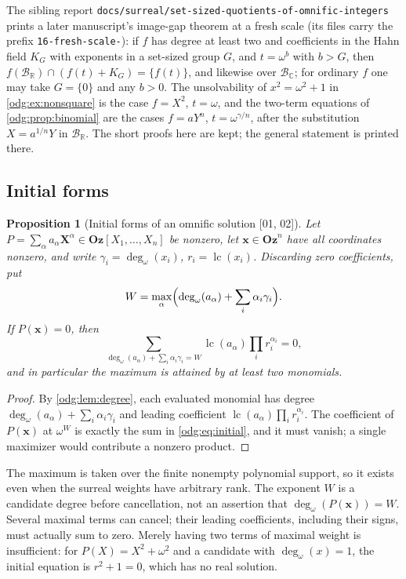\documentclass[11pt,oneside]{article}
\numberwithin{equation}{section}
\newtheorem{proposition}[proposition]{Proposition}
\theoremstyle{definition}
\theoremstyle{remark}
\newcommand{\Oz}{\mathbf{Oz}}
\newcommand{\R}{\mathbb R}
\newcommand{\C}{\mathbb C}
\newcommand{\BR}{\mathcal B_{\R}}
\newcommand{\BC}{\mathcal B_{\C}}
\newcommand{\lc}{\operatorname{lc}}
\newcommand{\ddeg}{\operatorname{deg}_{\omega}}
\newcommand{\src}[1]{\textup{\textsf{\small[#1]}}}
\newcommand{\fn}[1]{\nolinkurl{#1}}
\begin{document}
The sibling report \fn{docs/surreal/set-sized-quotients-of-omnific-integers}
prints a later manuscript's image-gap theorem at a fresh scale (its files
carry the prefix \fn{16-fresh-scale-}): if $f$ has degree at least two and
coefficients in the Hahn field $K_G$ with exponents in a set-sized group $G$,
and $t=\omega^b$ with $b>G$, then $f(\BR)\cap(f(t)+K_G)=\{f(t)\}$, and
likewise over $\BC$; for ordinary $f$ one may take $G=\{0\}$ and any $b>0$.
The unsolvability of $x^2=\omega^2+1$ in \cref{odg:ex:nonsquare} is the case
$f=X^2$, $t=\omega$, and the two-term equations of \cref{odg:prop:binomial}
are the cases $f=aY^n$, $t=\omega^{\gamma/n}$, after the substitution
$X=a^{1/n}Y$ in $\BR$. The short proofs here are kept; the general statement
is printed there.

\subsection{Initial forms}

\begin{proposition}[Initial forms of an omnific solution \src{01, 02}]\label{odg:prop:initial}
Let $P=\sum_\alpha a_\alpha\mathbf X^\alpha\in\Oz[X_1,\ldots,X_n]$ be nonzero,
let $\mathbf x\in\Oz^n$ have all coordinates nonzero, and write
$\gamma_i=\ddeg(x_i)$, $r_i=\lc(x_i)$. Discarding zero coefficients, put
\[
 W=\max_\alpha\Bigl(\ddeg(a_\alpha)+\sum_i\alpha_i\gamma_i\Bigr).
\]
If $P(\mathbf x)=0$, then
\begin{equation}\label{odg:eq:initial}
 \sum_{\ddeg(a_\alpha)+\sum_i\alpha_i\gamma_i=W}
       \lc(a_\alpha)\prod_i r_i^{\alpha_i}=0,
\end{equation}
and in particular the maximum is attained by at least two monomials.
\end{proposition}
\begin{proof}
By \cref{odg:lem:degree}, each evaluated monomial has degree
$\ddeg(a_\alpha)+\sum_i\alpha_i\gamma_i$ and leading coefficient
$\lc(a_\alpha)\prod_ir_i^{\alpha_i}$. The coefficient of $P(\mathbf x)$ at
$\omega^W$ is exactly the sum in \eqref{odg:eq:initial}, and it must vanish; a
single maximizer would contribute a nonzero product.
\end{proof}

The maximum is taken over the finite nonempty polynomial support, so it
exists even when the surreal weights have arbitrary rank. The exponent
$W$ is a candidate degree before cancellation, not an assertion that
$\ddeg(P(\mathbf x))=W$. Several maximal terms can cancel; their leading
coefficients, including their signs, must actually sum to zero. Merely
having two terms of maximal weight is insufficient: for $P(X)=X^2+\omega^2$
and a candidate with $\ddeg(x)=1$, the initial equation is $r^2+1=0$,
which has no real solution.
\end{document}
